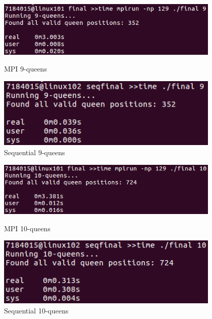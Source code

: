 \documentclass{article}
\begin{document}
\begin{figure}[h]
    \centering
    \begin{minipage}{0.49\textwidth}
        \centering
        \includegraphics[width=0.95\textwidth]{images/MPI_9}
        \caption{MPI 9-queens}
        \label{fig:mpi9}
    \end{minipage}\hfill
    \begin{minipage}{0.49\textwidth}
        \centering
        \includegraphics[width=0.95\textwidth]{images/MPI_2_9}
        \caption{Sequential 9-queens}
        \label{fig:seq9}
    \end{minipage}
\end{figure}

\begin{figure}[h]
    \centering
    \begin{minipage}{0.49\textwidth}
        \centering
        \includegraphics[width=0.95\textwidth]{images/MPI_10}
        \caption{MPI 10-queens}
        \label{fig:mpi10}
    \end{minipage}\hfill
    \begin{minipage}{0.49\textwidth}
        \centering
        \includegraphics[width=0.95\textwidth]{images/MPI_2_10}
        \caption{Sequential 10-queens}
        \label{fig:seq10}
    \end{minipage}
\end{figure}
\end{document}

